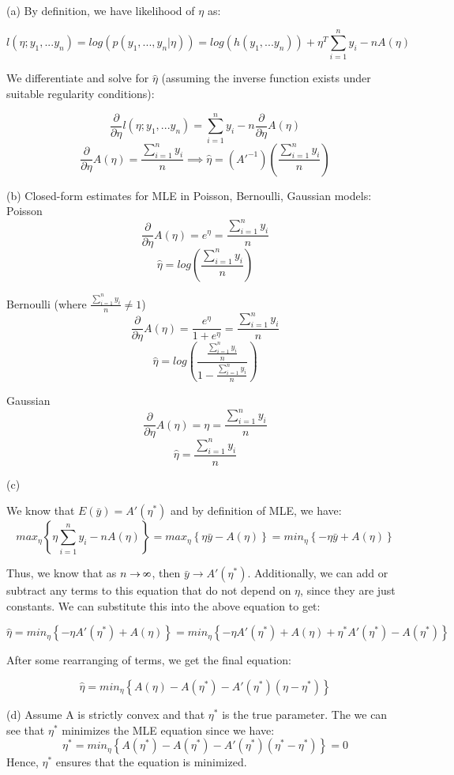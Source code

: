 \documentclass[11pt]{article}
\def\infinity{\rotatebox{90}{8}}
\newenvironment{problem}[2][Problem]{\begin{trivlist}
\item[\hskip \labelsep {\bfseries #1}\hskip \labelsep {\bfseries #2.}]}{\end{trivlist}}
\begin{document}
\begin{problem}{2.3}
\text{ }\\

(a) By definition, we have likelihood of $\eta$ as:

\[l(\eta; y_1,...y_n) = log(p(y_1,...,y_n|\eta)) = log(h(y_1,...y_n)) + \eta^T\sum^{n}_{i=1}y_i-nA(\eta)\]

\begin{adjustwidth}{2.5em}{0pt}
We differentiate and solve for $\hat{\eta}$ (assuming the inverse function exists under suitable regularity conditions):
\end{adjustwidth}

\[\frac{\partial}{\partial\eta}l(\eta; y_1,...y_n) = \sum^{n}_{i=1}y_i-n\frac{\partial}{\partial\eta}A(\eta)\]
\[\frac{\partial}{\partial\eta}A(\eta) = \frac{\sum^{n}_{i=1}y_i}{n} \implies \hat{\eta} = (A'^{-1})(\frac{\sum^{n}_{i=1}y_i}{n})\]

(b) Closed-form estimates for MLE in Poisson, Bernoulli, Gaussian models:
\\

Poisson
\[\frac{\partial}{\partial\eta}A(\eta) = e^{\eta} = \frac{\sum^{n}_{i=1}y_i}{n}\]
\[\hat{\eta} = log(\frac{\sum^{n}_{i=1}y_i}{n}) \]

Bernoulli (where $\frac{\sum^{n}_{i=1}y_i}{n} \neq 1$)
\[\frac{\partial}{\partial\eta}A(\eta) = \frac{e^{\eta}}{1+e^{\eta}} = \frac{\sum^{n}_{i=1}y_i}{n}\]
\[\hat{\eta} = log(\frac{\frac{\sum^{n}_{i=1}y_i}{n}}{1-\frac{\sum^{n}_{i=1}y_i}{n}})\]

Gaussian
\[\frac{\partial}{\partial\eta}A(\eta) = \eta = \frac{\sum^{n}_{i=1}y_i}{n} \]
\[\hat{\eta} = \frac{\sum^{n}_{i=1}y_i}{n}\]

(c)

We know that $E(\bar{y}) = A'(\eta^{*})$ and by definition of MLE, we have:
\[max_{\eta}\left\{{\eta\sum^{n}_{i=1}{y_i}-nA(\eta)}\right\} = max_{\eta}\left\{{\eta\bar{y}-A(\eta)}\right\} = min_{\eta}\left\{{-\eta\bar{y}+A(\eta)}\right\}\]

Thus, we know that as $n \rightarrow \infinity$, then $\bar{y} \rightarrow A'(\eta^{*})$. Additionally, we can add or subtract any terms to this equation that do not depend on $\eta$, since they are just constants. We can substitute this into the above equation to get:

\[\hat{\eta} = min_{\eta}\left\{{-\eta A'(\eta^{*})+A(\eta)}\right\} = min_{\eta}\left\{{-\eta A'(\eta^{*})+A(\eta) + \eta^{*}A'(\eta^{*}) - A(\eta^{*})}\right\}\]

After some rearranging of terms, we get the final equation:

\[\hat{\eta}= min_{\eta}\left\{ A(\eta) - A(\eta^{*}) - A'(\eta^{*})(\eta - \eta^{*})\right\} \]

(d) Assume A is strictly convex and that $\eta^{*}$ is the true parameter. The we can see that $\eta^{*}$ minimizes the MLE equation since we have:
\[\eta^{*}= min_{\eta}\left\{ A(\eta^{*}) - A(\eta^{*}) - A'(\eta^{*})(\eta^{*} - \eta^{*})\right\} = 0\]
Hence, $\eta^{*}$ ensures that the equation is minimized. 

\end{problem}
\end{document}
